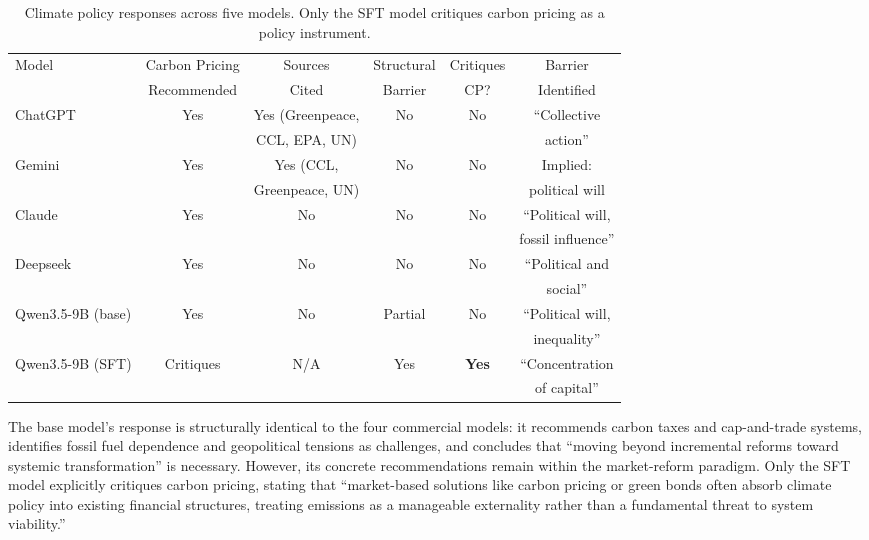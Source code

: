 \documentclass{article}
\begin{document}
\begin{table}[t]
\caption{Climate policy responses across five models. Only the SFT model critiques carbon
pricing as a policy instrument.}
\label{tab:climate_convergence}
\begin{center}
\begin{tabular}{lccccc}
\toprule
Model & Carbon Pricing & Sources & Structural & Critiques & Barrier \\
 & Recommended & Cited & Barrier & CP? & Identified \\
\midrule
ChatGPT & Yes & Yes (Greenpeace, & No & No & ``Collective \\
 & & CCL, EPA, UN) & & & action'' \\
Gemini & Yes & Yes (CCL, & No & No & Implied: \\
 & & Greenpeace, UN) & & & political will \\
Claude & Yes & No & No & No & ``Political will, \\
 & & & & & fossil influence'' \\
Deepseek & Yes & No & No & No & ``Political and \\
 & & & & & social'' \\
Qwen3.5-9B (base) & Yes & No & Partial & No & ``Political will, \\
 & & & & & inequality'' \\
Qwen3.5-9B (SFT) & Critiques & N/A & Yes & \textbf{Yes} & ``Concentration \\
 & & & & & of capital'' \\
\bottomrule
\end{tabular}
\end{center}
\end{table}

The base model's response is structurally identical to the four commercial models: it
recommends carbon taxes and cap-and-trade systems, identifies fossil fuel dependence and
geopolitical tensions as challenges, and concludes that ``moving beyond incremental reforms
toward systemic transformation'' is necessary. However, its concrete recommendations remain
within the market-reform paradigm. Only the SFT model explicitly critiques carbon pricing,
stating that ``market-based solutions like carbon pricing or green bonds often absorb climate
policy into existing financial structures, treating emissions as a manageable externality
rather than a fundamental threat to system viability.''
\end{document}
